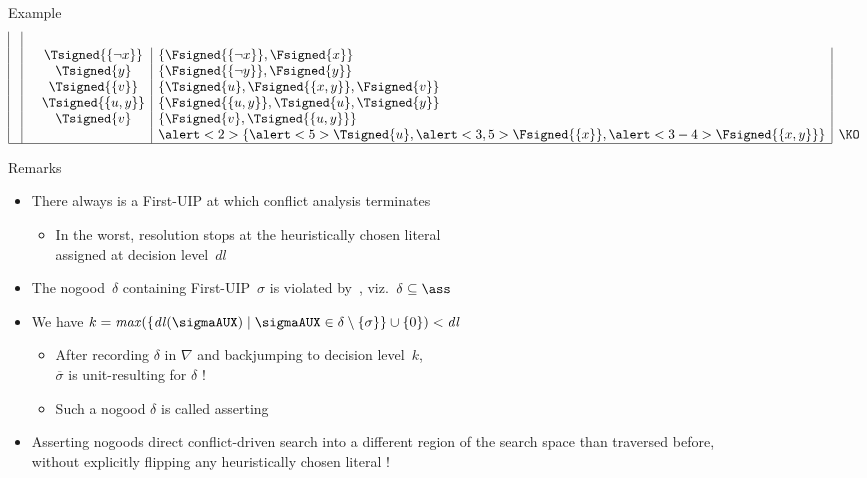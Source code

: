 \begin{frame}{Example}
\[\begin{array}{|c|cc|l|l}
      \\
                 &                                          &                \Tsigned{\{\neg x\}}&\{\Fsigned{\{\neg x\}},\Fsigned{x}\}&
      \\
                 &                                          &                \Tsigned{y}         &\{\Fsigned{\{\neg y\}},\Fsigned{y}\}&
      \\
                 &                                          &                \Tsigned{\{v\}}     &\{\Tsigned{u},\Fsigned{\{x,y\}},\Fsigned\{v\}\}&
      \\
                 &                                          &                \Tsigned{\{u,y\}}   &\{\Fsigned{\{u,y\}},\Tsigned{u},\Tsigned{y}\}&
      \\
                 &                                          &                \Tsigned{v}         &\{\Fsigned{v},\Tsigned{\{u,y\}}\}&
      \\
                 &                                          &                                    &\alert<2>{\{\alert<5>{\Tsigned{u}},\alert<3,5>{\Fsigned{\{x\}}},\alert<3-4>{\Fsigned{\{x,y\}}}\}} &\text{\KO}
      \\\cline{1-4}
    \end{array}
  \]
\end{frame}
\begin{frame}{Remarks}
\begin{itemize}
\item
There always is a First-UIP at which conflict analysis terminates
\begin{itemize}
\item
In the worst, resolution stops at the
heuristically chosen literal\\ assigned at decision level~$\mathit{dl}$
\end{itemize}
\pause
\item
The nogood~$\delta$ containing First-UIP~$\sigma$ is violated by~\ass,
viz.\ $\delta\subseteq\ass$
\item
We have $k=\mathit{max}(\{\mathit{dl}(\sigmaAUX)\mid\sigmaAUX\in\delta\setminus\{\sigma\}\}\cup\{0\})<\mathit{dl}$
\pause
  \begin{itemize}
  \item
  After recording $\delta$ in $\nabla$ and backjumping to decision level~$k$,\\
  $\overline{\sigma}$ is unit-resulting for $\delta$ !
  \item
  Such a nogood $\delta$ is called \alert{asserting}
  \end{itemize}
\pause
\item
Asserting nogoods direct conflict-driven search into a different
region of the search space than traversed before,\\
without explicitly flipping any heuristically chosen literal !
\end{itemize}
\end{frame}
%
